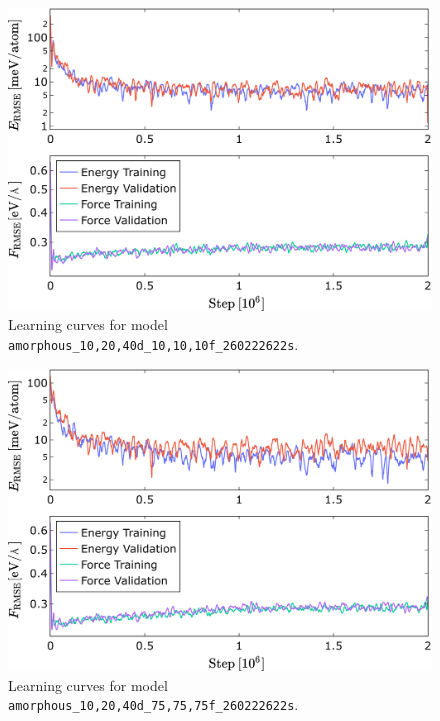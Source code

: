 \begin{figure}
  \begin{center}
    \includegraphics[width=.8\textwidth]{
      asset/amorphous_10,20,40d_10,10,10f_260222622s_energy_force_l_curve.jpg
    }
  \end{center}
  \caption{Learning curves for model \texttt{amorphous\_10,20,40d\_10,10,\allowbreak{}10f\_260222622s}.}
  \label{fig:amorphous_10,20,40d_10,10,10f_260222622s-learning-curves}
\end{figure}

\begin{figure}
  \begin{center}
    \includegraphics[width=.8\textwidth]{
      asset/amorphous_10,20,40d_75,75,75f_260222622s_energy_force_l_curve.jpg
    }
  \end{center}
  \caption{Learning curves for model \texttt{amorphous\_10,20,40d\_75,75,\allowbreak{}75f\_260222622s}.}
  \label{fig:amorphous_10,20,40d_75,75,75f_260222622s-learning-curves}
\end{figure}

